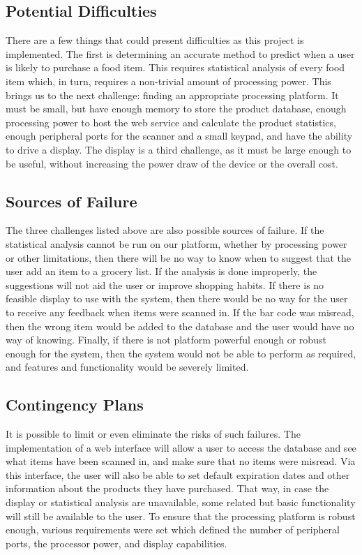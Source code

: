 \documentclass[11pt,letterpaper]{article}
\begin{document}
\subsection{Potential Difficulties}
\noindent There are a few things that could present difficulties as this project is implemented. The first is determining an accurate method to predict when a user is likely to purchase a food item. This requires statistical analysis of every food item which, in turn, requires a non-trivial amount of processing power. This brings us to the next challenge: finding an appropriate processing platform. It must be small, but have enough memory to store the product database, enough processing power to host the web service and calculate the product statistics, enough peripheral ports for the scanner and a small keypad, and have the ability to drive a display. The display is a third challenge, as it must be large enough to be useful, without increasing the power draw of the device or the overall cost. 

\subsection{Sources of Failure}
\noindent The three challenges listed above are also possible sources of failure. If the statistical analysis cannot be run on our platform, whether by processing power or other limitations, then there will be no way to know when to suggest that the user add an item to a grocery list. If the analysis is done improperly, the suggestions will not aid the user or improve shopping habits. If there is no feasible display to use with the system, then there would be no way for the user to receive any feedback when items were scanned in. If the bar code was misread, then the wrong item would be added to the database and the user would have no way of knowing. Finally, if there is not platform powerful enough or robust enough for the system, then the system would not be able to perform as required, and features and functionality would be severely limited.

\subsection {Contingency Plans}
\noindent It is possible to limit or even eliminate the risks of such failures. The implementation of a web interface will allow a user to access the database and see what items have been scanned in, and make sure that no items were misread. Via this interface, the user will also be able to set default expiration dates and other information about the products they have purchased. That way, in case the display or statistical analysis are unavailable, some related but basic functionality will still be available to the user. To ensure that the processing platform is robust enough, various requirements were set which defined the number of peripheral ports, the processor power, and display capabilities.
\end{document}
